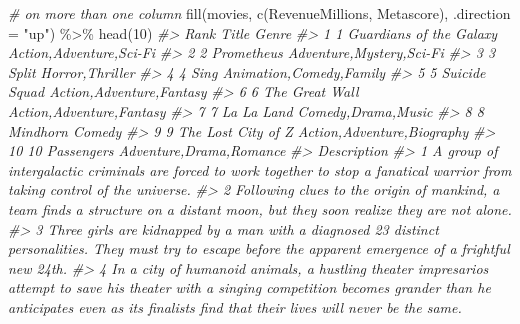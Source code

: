 \documentclass[
]{book}
\newenvironment{Shaded}{\begin{snugshade}}{\end{snugshade}}
\newcommand{\AttributeTok}[1]{\textcolor[rgb]{0.77,0.63,0.00}{#1}}
\newcommand{\CommentTok}[1]{\textcolor[rgb]{0.56,0.35,0.01}{\textit{#1}}}
\newcommand{\DecValTok}[1]{\textcolor[rgb]{0.00,0.00,0.81}{#1}}
\newcommand{\FunctionTok}[1]{\textcolor[rgb]{0.00,0.00,0.00}{#1}}
\newcommand{\NormalTok}[1]{#1}
\newcommand{\SpecialCharTok}[1]{\textcolor[rgb]{0.00,0.00,0.00}{#1}}
\newcommand{\StringTok}[1]{\textcolor[rgb]{0.31,0.60,0.02}{#1}}
\begin{document}
\begin{Shaded}
\begin{Highlighting}[]
\CommentTok{\# on more than one column}
\FunctionTok{fill}\NormalTok{(movies, }\FunctionTok{c}\NormalTok{(RevenueMillions, Metascore), }\AttributeTok{.direction =} \StringTok{"up"}\NormalTok{) }\SpecialCharTok{\%\textgreater{}\%}
\FunctionTok{head}\NormalTok{(}\DecValTok{10}\NormalTok{)}
\CommentTok{\#\textgreater{}    Rank                   Title                      Genre}
\CommentTok{\#\textgreater{} 1     1 Guardians of the Galaxy    Action,Adventure,Sci{-}Fi}
\CommentTok{\#\textgreater{} 2     2              Prometheus   Adventure,Mystery,Sci{-}Fi}
\CommentTok{\#\textgreater{} 3     3                   Split            Horror,Thriller}
\CommentTok{\#\textgreater{} 4     4                    Sing    Animation,Comedy,Family}
\CommentTok{\#\textgreater{} 5     5           Suicide Squad   Action,Adventure,Fantasy}
\CommentTok{\#\textgreater{} 6     6          The Great Wall   Action,Adventure,Fantasy}
\CommentTok{\#\textgreater{} 7     7              La La Land         Comedy,Drama,Music}
\CommentTok{\#\textgreater{} 8     8                Mindhorn                     Comedy}
\CommentTok{\#\textgreater{} 9     9      The Lost City of Z Action,Adventure,Biography}
\CommentTok{\#\textgreater{} 10   10              Passengers    Adventure,Drama,Romance}
\CommentTok{\#\textgreater{}                                                                                                                                                                                                                                        Description}
\CommentTok{\#\textgreater{} 1                                                                                                                  A group of intergalactic criminals are forced to work together to stop a fanatical warrior from taking control of the universe.}
\CommentTok{\#\textgreater{} 2                                                                                                                  Following clues to the origin of mankind, a team finds a structure on a distant moon, but they soon realize they are not alone.}
\CommentTok{\#\textgreater{} 3                                                                                    Three girls are kidnapped by a man with a diagnosed 23 distinct personalities. They must try to escape before the apparent emergence of a frightful new 24th.}
\CommentTok{\#\textgreater{} 4                   In a city of humanoid animals, a hustling theater impresario\textquotesingle{}s attempt to save his theater with a singing competition becomes grander than he anticipates even as its finalists\textquotesingle{} find that their lives will never be the same.}

\end{Highlighting}
\end{Shaded}
\end{document}
